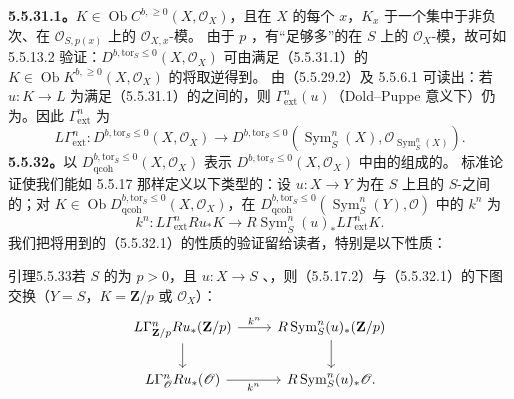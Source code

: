 \textbf{5.5.31.1。}$K\in\operatorname{Ob}C^{b,\geq0}(X,\mathscr O_X)$，且在 $X$ 的每个 $x$，$K_x$ 于一个集中于非负次、在 $\mathscr O_{S,p(x)}$ 上的 $\mathscr O_{X,x}$-模。
由于 $p$ ，有“足够多”的在 $S$ 上的 $\mathscr O_X$-模，故可如 5.5.13.2 验证：$D^{b,\mathrm{tor}_S\leq0}(X,\mathscr O_X)$ 可由满足（5.5.31.1）的 $K\in\operatorname{Ob}K^{b,\geq0}(X,\mathscr O_X)$ 的将取逆得到。
由（5.5.29.2）及 5.5.6.1 可读出：若 $u:K\to L$ 为满足（5.5.31.1）的之间的，则 $\Gamma^n_{\mathrm{ext}}(u)$（Dold--Puppe 意义下）仍为。因此 $\Gamma^n_{\mathrm{ext}}$ 为
\begin{equation}\tag{5.5.31.2}L\Gamma^n_{\mathrm{ext}}:D^{b,\mathrm{tor}_S\leq0}(X,\mathscr O_X)\longrightarrow D^{b,\mathrm{tor}_S\leq0}(\operatorname{Sym}^n_S(X),\mathscr O_{\operatorname{Sym}^n_S(X)}).\end{equation}
\textbf{5.5.32。}以 $D^{b,\mathrm{tor}_S\leq0}_{\mathrm{qcoh}}(X,\mathscr O_X)$ 表示 $D^{b,\mathrm{tor}_S\leq0}(X,\mathscr O_X)$ 中由的组成的。
标准论证使我们能如 5.5.17 那样定义以下类型的：设 $u:X\to Y$ 为在 $S$ 上且的 $S$-之间的；对 $K\in\operatorname{Ob}D^{b,\mathrm{tor}_S\leq0}_{\mathrm{qcoh}}(X,\mathscr O_X)$，在 $D^{b,\mathrm{tor}_S\leq0}_{\mathrm{qcoh}}(\operatorname{Sym}^n_S(Y),\mathscr O)$ 中的 $k^n$ 为
\begin{equation}\tag{5.5.32.1}k^n:L\Gamma^n_{\mathrm{ext}}Ru_*K\longrightarrow R\operatorname{Sym}^n_S(u)_*L\Gamma^n_{\mathrm{ext}}K.\end{equation}
我们把将用到的（5.5.32.1）的性质的验证留给读者，特别是以下性质：
\begin{SGAresult}{引理}{5.5.33}若 $S$ 的为 $p>0$，且 $u:X\to S$ 、，则（5.5.17.2）与（5.5.32.1）的下图交换（$Y=S$，$K=\mathbf Z/p$ 或 $\mathscr O_X$）：
\[\begin{tikzcd}
L\Gamma^n_{\mathbf Z/p}Ru_*(\mathbf Z/p)\arrow[r,"k^n"]\arrow[d]&R\operatorname{Sym}^n_S(u)_*(\mathbf Z/p)\arrow[d]\\
L\Gamma^n_{\mathscr O}Ru_*(\mathscr O)\arrow[r,"k^n"']&R\operatorname{Sym}^n_S(u)_*\mathscr O.
\end{tikzcd}\]
\end{SGAresult}
